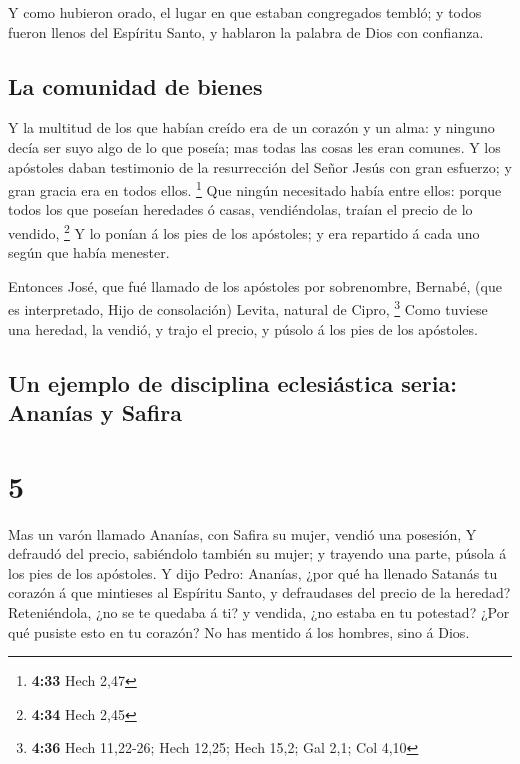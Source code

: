  Y como hubieron orado, el lugar en que estaban congregados
tembló; y todos fueron llenos del Espíritu Santo, y hablaron la palabra
de Dios con confianza.

\hypertarget{la-comunidad-de-bienes}{%
\subsection{La comunidad de bienes}\label{la-comunidad-de-bienes}}

 Y la multitud de los que habían creído era de un corazón y
un alma: y ninguno decía ser suyo algo de lo que poseía; mas todas las
cosas les eran comunes.  Y los apóstoles daban testimonio
de la resurrección del Señor Jesús con gran esfuerzo; y gran gracia era
en todos ellos. \footnote{\textbf{4:33} Hech 2,47}  Que
ningún necesitado había entre ellos: porque todos los que poseían
heredades ó casas, vendiéndolas, traían el precio de lo vendido,
\footnote{\textbf{4:34} Hech 2,45}  Y lo ponían á los pies
de los apóstoles; y era repartido á cada uno según que había menester.

 Entonces José, que fué llamado de los apóstoles por
sobrenombre, Bernabé, (que es interpretado, Hijo de consolación) Levita,
natural de Cipro, \footnote{\textbf{4:36} Hech 11,22-26; Hech 12,25;
  Hech 15,2; Gal 2,1; Col 4,10}  Como tuviese una heredad,
la vendió, y trajo el precio, y púsolo á los pies de los apóstoles.

\hypertarget{un-ejemplo-de-disciplina-eclesiuxe1stica-seria-ananuxedas-y-safira}{%
\subsection{Un ejemplo de disciplina eclesiástica seria: Ananías y
Safira}\label{un-ejemplo-de-disciplina-eclesiuxe1stica-seria-ananuxedas-y-safira}}

\hypertarget{section-4}{%
\section{5}\label{section-4}}

 Mas un varón llamado Ananías, con Safira su mujer, vendió
una posesión,  Y defraudó del precio, sabiéndolo también su
mujer; y trayendo una parte, púsola á los pies de los apóstoles.
 Y dijo Pedro: Ananías, ¿por qué ha llenado Satanás tu
corazón á que mintieses al Espíritu Santo, y defraudases del precio de
la heredad?  Reteniéndola, ¿no se te quedaba á ti? y
vendida, ¿no estaba en tu potestad? ¿Por qué pusiste esto en tu corazón?
No has mentido á los hombres, sino á Dios.

